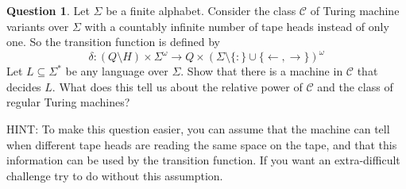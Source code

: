 \documentclass{article}
\theoremstyle{definition}
\newtheorem{Q}{Question}
\newcommand{\ra}{\rightarrow}
\newcommand{\la}{\leftarrow}
\begin{document}
\begin{Q}
Let $\Sigma$ be a finite alphabet. Consider the class $\mathcal C$ of Turing machine variants over $\Sigma$ with a countably infinite number of tape heads instead of only one. So the transition function is defined by \begin{equation*}\delta:(Q\setminus H)\times \Sigma^\omega \to Q\times(\Sigma\setminus\{:\}\cup \{\la,\ra\})^\omega \end{equation*}
Let $L\subseteq \Sigma^*$ be any language over $\Sigma$. Show that there is a machine in $\mathcal C$ that decides $L$. What does this tell us about the relative power of $\mathcal C$ and the class of regular Turing machines?

HINT: To make this question easier, you can assume that the machine can tell when different tape heads are reading the same space on the tape, and that this information can be used by the transition function. If you want an extra-difficult challenge try to do without this assumption.
\end{Q}
\end{document}
